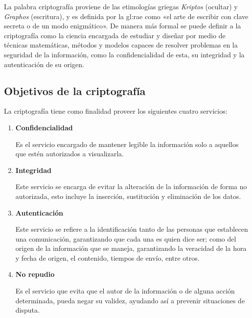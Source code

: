 
La palabra criptografía proviene de las etimologías griegas \textit{Kriptos}
(ocultar) y \textit{Graphos} (escritura), y es definida por la \gls{gl:rae}
como «el arte de escribir con clave secreta o de un modo enigmático».
De manera más formal se puede definir a la criptografía como la ciencia
encargada de estudiar y diseñar por medio de técnicas matemáticas, métodos y
modelos capaces de resolver problemas en la seguridad de la información, como
la confidencialidad de esta, su integridad y la autenticación de su origen.

  \subsection{Objetivos de la criptografía}

    La criptografía tiene como finalidad proveer los siguientes cuatro
    servicios:

    \begin{enumerate}

      \item \textbf{Confidencialidad}

        Es el servicio encargado de mantener legible la información solo a
        aquellos que estén autorizados a visualizarla.

      \item \textbf{Integridad}

        Este servicio se encarga de evitar la alteración de la información de
        forma no autorizada, esto incluye la inserción, sustitución y
        eliminación de los datos.

      \item \textbf{Autenticación}

        Este servicio se refiere a la identificación tanto de las personas que
        establecen una comunicación, garantizando que cada una es quien dice
        ser; como del origen de la información que se maneja, garantizando la
        veracidad de la hora y fecha de origen, el contenido, tiempos de
        envío, entre otros.

      \item \textbf{No repudio}

        Es el servicio que evita que el autor de la información o de alguna
        acción determinada, pueda negar su validez, ayudando así a prevenir
        situaciones de disputa.

    \end{enumerate}
